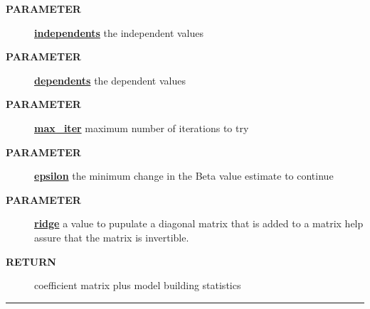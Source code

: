 \par
\begin{description}
\item [\colorbox{tagtype}{\color{white} \textbf{\textsf{PARAMETER}}}] \textbf{\underline{independents}} the independent values
\item [\colorbox{tagtype}{\color{white} \textbf{\textsf{PARAMETER}}}] \textbf{\underline{dependents}} the dependent values
\item [\colorbox{tagtype}{\color{white} \textbf{\textsf{PARAMETER}}}] \textbf{\underline{max\_iter}} maximum number of iterations to try
\item [\colorbox{tagtype}{\color{white} \textbf{\textsf{PARAMETER}}}] \textbf{\underline{epsilon}} the minimum change in the Beta value estimate to continue
\item [\colorbox{tagtype}{\color{white} \textbf{\textsf{PARAMETER}}}] \textbf{\underline{ridge}} a value to pupulate a diagonal matrix that is added to a matrix help assure that the matrix is invertible.
\item [\colorbox{tagtype}{\color{white} \textbf{\textsf{RETURN}}}] \textbf{\underline{}} coefficient matrix plus model building statistics
\end{description}

\rule{\linewidth}{0.5pt}
